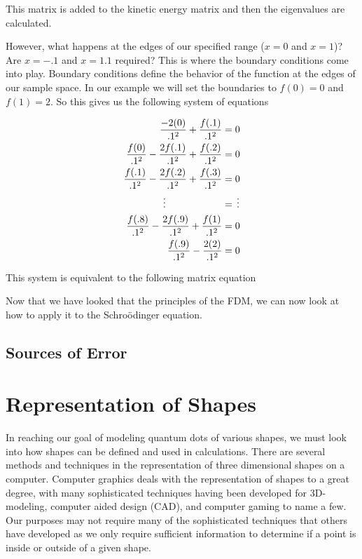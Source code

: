 \documentclass[authoryearcitations]{UoYCSproject}
\begin{document}
This matrix is added to the kinetic energy matrix and then the eigenvalues are calculated. 


 
However, what happens at the edges of our specified range ($x = 0$ and $x = 1$)? Are $x = -.1$
and $x = 1.1$ required? This is where the boundary conditions come into play. Boundary conditions define the behavior
of the function at the edges of our sample space. 
In our example we will set the boundaries to $f(0) = 0$ and $f(1) = 2$. So this gives us the following system of equations

\begin{align}
\frac{-2(0)}{.1^2} + \frac{f(.1)}{.1^2} &= 0  \nonumber \\
\frac{f(0)}{.1^2} - \frac{2f(.1)}{.1^2} + \frac{f(.2)}{.1^2} &= 0 \nonumber \\
\frac{f(.1)}{.1^2} - \frac{2f(.2)}{.1^2} + \frac{f(.3)}{.1^2} &= 0\nonumber \\
\vdots \hspace{.8in} &= \, \vdots \nonumber \\
\frac{f(.8)}{.1^2} - \frac{2f(.9)}{.1^2} + \frac{f(1)}{.1^2} &= 0 \nonumber \\
\frac{f(.9)}{.1^2} - \frac{2(2)}{.1^2} &= 0 \nonumber
\end{align}

This system is equivalent to the following matrix equation



Now that we have looked that the principles of the FDM, we can now look at how to apply it to the Schro\"{o}dinger equation.

\subsection{Sources of Error}

\section{Representation of Shapes}
In reaching our goal of modeling quantum dots of various shapes, we must look into how shapes can be defined and used in 
calculations. There are several methods and techniques in the representation of three dimensional shapes on a computer. 
Computer graphics deals with the representation of shapes to a great degree, with many sophisticated techniques having been 
developed for 3D-modeling, computer aided design (CAD), and computer gaming to name a few. Our purposes may not require
many of the sophisticated techniques that others have developed as we only require sufficient information to determine if
a point is inside or outside of a given shape. 
\end{document}
